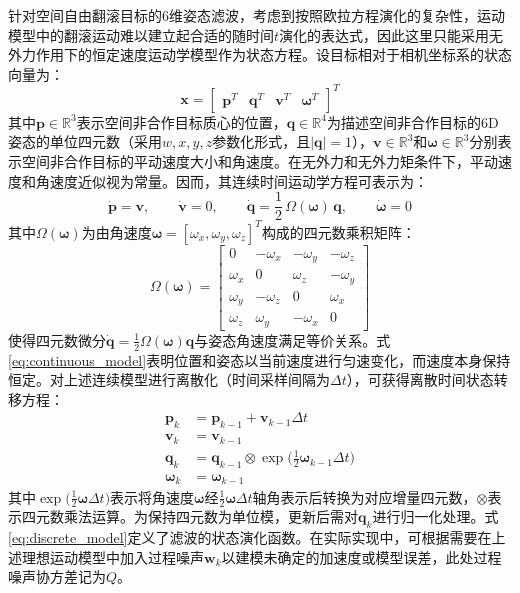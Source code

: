 针对空间自由翻滚目标的6维姿态滤波，考虑到按照欧拉方程演化的复杂性，运动模型中的翻滚运动难以建立起合适的随时间$t$演化的表达式，因此这里只能采用无外力作用下的恒定速度运动学模型作为状态方程。设目标相对于相机坐标系的状态向量为：
\begin{equation}
	\mathbf{x} =
	\begin{bmatrix}
		\mathbf{p}^T & \mathbf{q}^T & \mathbf{v}^T & \boldsymbol{\omega}^T
	\end{bmatrix}^T
\end{equation}
其中$\mathbf{p} \in \mathbb{R}^3$表示空间非合作目标质心的位置，$\mathbf{q} \in \mathbb{R}^4$为描述空间非合作目标的6D姿态的单位四元数（采用${w,x,y,z}$参数化形式，且$|\mathbf{q}|=1$），$\mathbf{v} \in \mathbb{R}^3$和$\boldsymbol{\omega} \in \mathbb{R}^3$分别表示空间非合作目标的平动速度大小和角速度。在无外力和无外力矩条件下，平动速度和角速度近似视为常量。因而，其连续时间运动学方程可表示为：
\begin{equation}\label{eq:continuous_model}
	\dot{\mathbf{p}} = \mathbf{v}, \qquad
	\dot{\mathbf{v}} = 0, \qquad
	\dot{\mathbf{q}} = \frac{1}{2}\,\Omega(\boldsymbol{\omega})\,\mathbf{q}, \qquad
	\dot{\boldsymbol{\omega}} = 0
\end{equation}
其中$\Omega(\boldsymbol{\omega})$为由角速度$\boldsymbol{\omega}=[\omega_x,\omega_y,\omega_z]^T$构成的四元数乘积矩阵：
\begin{equation}
	\Omega(\boldsymbol{\omega}) =
	\begin{bmatrix}
		0        & -\omega_x & -\omega_y & -\omega_z \\
		\omega_x & 0         & \omega_z  & -\omega_y \\
		\omega_y & -\omega_z & 0         & \omega_x  \\
		\omega_z & \omega_y  & -\omega_x & 0
	\end{bmatrix}
\end{equation}
使得四元数微分$\dot{\mathbf{q}} = \frac{1}{2}\Omega(\boldsymbol{\omega})\mathbf{q}$与姿态角速度满足等价关系。式\eqref{eq:continuous_model}表明位置和姿态以当前速度进行匀速变化，而速度本身保持恒定。对上述连续模型进行离散化（时间采样间隔为$\Delta t$），可获得离散时间状态转移方程：
\begin{equation}\label{eq:discrete_model}
	\begin{aligned}
		\mathbf{p}_{k} &= \mathbf{p}_{k-1} + \mathbf{v}_{k-1}\Delta t\\
		\mathbf{v}_{k} &= \mathbf{v}_{k-1}\\
		\mathbf{q}_{k} &= \mathbf{q}_{k-1} \otimes
		\exp\!\bigl(\tfrac{1}{2}\boldsymbol{\omega}_{k-1}\Delta t\bigr)\\
		\boldsymbol{\omega}_{k} &= \boldsymbol{\omega}_{k-1}
	\end{aligned}
\end{equation}
其中$\exp\!\bigl(\tfrac{1}{2}\boldsymbol{\omega}\Delta t\bigr)$表示将角速度$\boldsymbol{\omega}$经$\tfrac{1}{2}\boldsymbol{\omega}\Delta t$轴角表示后转换为对应增量四元数，$\otimes$表示四元数乘法运算。为保持四元数为单位模，更新后需对$\mathbf{q}_k$进行归一化处理。式\eqref{eq:discrete_model}定义了滤波的状态演化函数。在实际实现中，可根据需要在上述理想运动模型中加入过程噪声$\mathbf{w}_k$以建模未确定的加速度或模型误差，此处过程噪声协方差记为$Q$。


